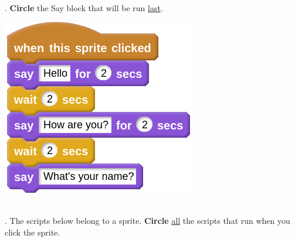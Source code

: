 \documentclass[letterpaper,12pt]{article}
\begin{document}
\noindent \dotfill \\

. \textbf{Circle} the Say block that will be run \underline{last}.  \\
\begin{center}
\includegraphics[scale=.4]{q2_script0.png}
\end{center}

\noindent \dotfill \\

. The scripts below belong to a sprite. \textbf{Circle} \underline{all} the scripts that run when you click the sprite. \\
\end{document}
